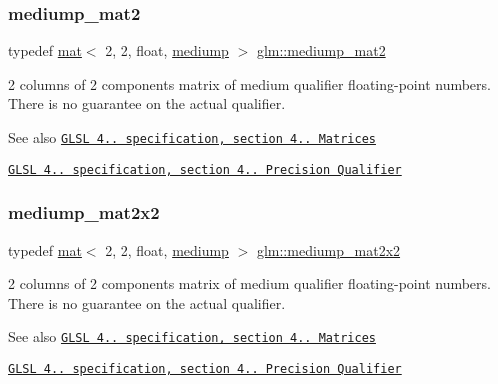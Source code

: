 \subsubsection{\texorpdfstring{mediump\+\_\+mat2}{mediump\_mat2}}
{\footnotesize\ttfamily typedef \mbox{\hyperlink{structglm_1_1mat}{mat}}$<$ 2, 2, float, \mbox{\hyperlink{namespaceglm_a36ed105b07c7746804d7fdc7cc90ff25a6416f3ea0c9025fb21ed50c4d6620482}{mediump}} $>$ \mbox{\hyperlink{group__core__precision_ga698131fdb127cb55e8b70cc1b2c4ff67}{glm\+::mediump\+\_\+mat2}}}

2 columns of 2 components matrix of medium qualifier floating-\/point numbers. There is no guarantee on the actual qualifier.

\begin{DoxySeeAlso}{See also}
\href{http://www.opengl.org/registry/doc/GLSLangSpec.4.20.8.pdf}{\tt G\+L\+SL 4.. specification, section 4.. Matrices} 

\href{http://www.opengl.org/registry/doc/GLSLangSpec.4.20.8.pdf}{\tt G\+L\+SL 4.. specification, section 4.. Precision Qualifier} 
\end{DoxySeeAlso}
\mbox{\label{group__core__precision_gaa7581ec892b01e6ba19c4fdbc7c60df4}} 
\subsubsection{\texorpdfstring{mediump\+\_\+mat2x2}{mediump\_mat2x2}}
{\footnotesize\ttfamily typedef \mbox{\hyperlink{structglm_1_1mat}{mat}}$<$ 2, 2, float, \mbox{\hyperlink{namespaceglm_a36ed105b07c7746804d7fdc7cc90ff25a6416f3ea0c9025fb21ed50c4d6620482}{mediump}} $>$ \mbox{\hyperlink{group__core__precision_gaa7581ec892b01e6ba19c4fdbc7c60df4}{glm\+::mediump\+\_\+mat2x2}}}

2 columns of 2 components matrix of medium qualifier floating-\/point numbers. There is no guarantee on the actual qualifier.

\begin{DoxySeeAlso}{See also}
\href{http://www.opengl.org/registry/doc/GLSLangSpec.4.20.8.pdf}{\tt G\+L\+SL 4.. specification, section 4.. Matrices} 

\href{http://www.opengl.org/registry/doc/GLSLangSpec.4.20.8.pdf}{\tt G\+L\+SL 4.. specification, section 4.. Precision Qualifier} 
\end{DoxySeeAlso}
\mbox{\label{group__core__precision_gae5003c3cea9aa152bf452223b7fd0fd5}} 
